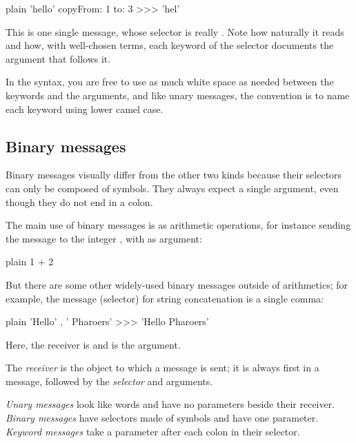 \documentclass[10pt,twoside,english]{_support/latex/sbabook/sbabook}
\begin{document}
\begin{displaycode}{plain}
'hello' copyFrom: 1 to: 3
>>> 'hel'
\end{displaycode}

This is one single message, whose selector is really .
Note how naturally it reads and how, with well-chosen terms, each keyword of the selector documents the argument that follows it.

In the syntax, you are free to use as much white space as needed between the keywords and the arguments, and like unary messages, the convention is to name each keyword using lower camel case.
\subsection{Binary messages}
Binary messages visually differ from the other two kinds because their selectors can only be composed of symbols.
They always expect a single argument, even though they do not end in a colon.

The main use of binary messages is as arithmetic operations, for instance sending the message \textcode{+} to the integer , with  as argument:

\begin{displaycode}{plain}
1 + 2
\end{displaycode}

But there are some other widely-used binary messages outside of arithmetics; for example, the message (selector) for string concatenation is a single comma:

\begin{displaycode}{plain}
'Hello' , ' Pharoers'
>>> 'Hello Pharoers'
\end{displaycode}

Here, the receiver is  and  is the argument.

\begin{coffee}
The \textit{receiver} is the object to which a message is sent; it is always first in a message, followed by the \textit{selector} and arguments.
\end{coffee}

\begin{coffee}
\textit{Unary messages} look like words and have no parameters beside their receiver. \textit{Binary messages} have selectors made of symbols and have one parameter. \textit{Keyword messages} take a parameter after each colon in their selector.
\end{coffee}
\end{document}
